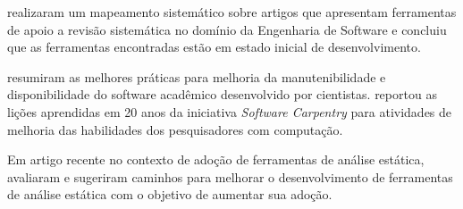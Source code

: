  realizaram um mapeamento sistemático sobre 
artigos que apresentam ferramentas de apoio a revisão sistemática no domínio da
Engenharia de Software
e concluiu que as
ferramentas encontradas estão em estado inicial de desenvolvimento.

 resumiram as melhores práticas para melhoria da
manutenibilidade e disponibilidade do software acadêmico desenvolvido por
cientistas.
 reportou  
as lições aprendidas em 20 anos da iniciativa {\it Software Carpentry} 
para atividades de melhoria das
habilidades dos pesquisadores com computação.

Em artigo recente no contexto de adoção de ferramentas de análise estática,
 avaliaram e sugeriram caminhos 
para melhorar o desenvolvimento de ferramentas de análise estática 
com o objetivo de aumentar sua adoção.
